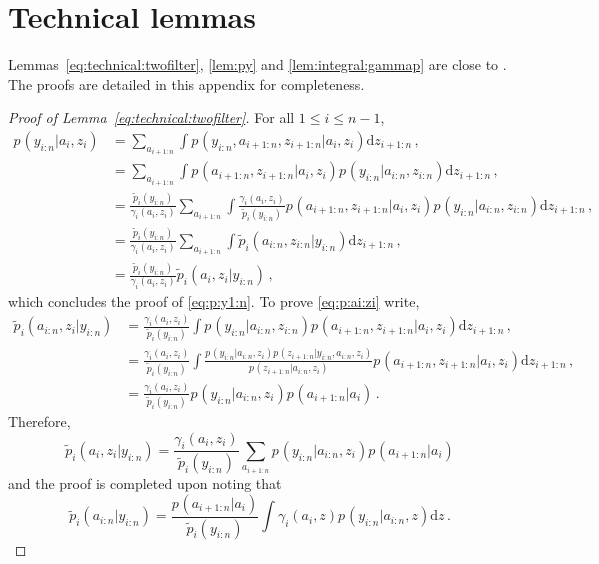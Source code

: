 \documentclass[nolayout]{article}
\theoremstyle{plain}
\theoremstyle{definition}
\newcommand{\1}{\mathbbm{1}}
\def\rmd{\mathrm{d}}
\def\eqsp{\,}
\begin{document}
\section{Technical lemmas}
\label{sec:app}
Lemmas~\ref{eq:technical:twofilter}, \ref{lem:py} and \ref{lem:integral:gammap} are close to \cite[Proposition 5, Proposition 6]{briers:doucet:maskell:2010}. The proofs are detailed in this appendix for completeness.
\begin{proof}[Proof of Lemma~\ref{eq:technical:twofilter}]
For all $1\le i \le n-1$,
\begin{align*}
p_{}(y_{i:n}|a_i,z_i) &= \sum_{a_{i+1:n}}\int p_{}(y_{i:n},a_{i+1:n},z_{i+1:n}|a_i,z_i)\rmd z_{i+1:n}\eqsp,\\
&=  \sum_{a_{i+1:n}}\int p_{}(a_{i+1:n},z_{i+1:n}|a_i,z_i)p_{}(y_{i:n}|a_{i:n},z_{i:n})\rmd z_{i+1:n}\eqsp,\\
&=  \frac{\tilde{p}_{i}(y_{i:n})}{\gamma^{}_{i}(a_i,z_i)}\sum_{a_{i+1:n}}\int \frac{\gamma^{}_{i}(a_i,z_i)}{\tilde{p}_{i}(y_{i:n})}p_{}(a_{i+1:n},z_{i+1:n}|a_i,z_i)p_{}(y_{i:n}|a_{i:n},z_{i:n})\rmd z_{i+1:n}\eqsp,\\
&=  \frac{\tilde{p}_{i}(y_{i:n})}{\gamma^{}_{i}(a_i,z_i)}\sum_{a_{i+1:n}}\int \tilde{p}_{i}(a_{i:n},z_{i:n}|y_{i:n})\rmd z_{i+1:n}\eqsp,\\
&=  \frac{\tilde{p}_{i}(y_{i:n})}{\gamma^{}_{i}(a_i,z_i)}\tilde{p}_{i}(a_{i},z_{i}|y_{i:n})\eqsp,
\end{align*}
which concludes the proof of \eqref{eq:p:y1:n}. To prove \eqref{eq:p:ai:zi} write,
\begin{align*}
\tilde{p}_{i}(a_{i:n},z_{i}|y_{i:n}) &= \frac{\gamma^{}_{i}(a_i,z_i)}{\tilde{p}_{i}(y_{i:n})}\int p_{}(y_{i:n}|a_{i:n},z_{i:n})p_{}(a_{i+1:n},z_{i+1:n}|a_{i},z_{i})\rmd z_{i+1:n}\eqsp,\\
&= \frac{\gamma^{}_{i}(a_i,z_i)}{\tilde{p}_{i}(y_{i:n})}\int \frac{p_{}(y_{i:n}|a_{i:n},z_{i})p_{}(z_{i+1:n}|y_{i:n},a_{i:n},z_i)}{p_{}(z_{i+1:n}|a_{i:n},z_i)}p_{}(a_{i+1:n},z_{i+1:n}|a_{i},z_{i})\rmd z_{i+1:n}\eqsp,\\
&=\frac{\gamma^{}_{i}(a_i,z_i)}{\tilde{p}_{i}(y_{i:n})}p_{}(y_{i:n}|a_{i:n},z_{i})p_{}(a_{i+1:n}|a_i)\eqsp.
\end{align*}
Therefore,
\[
\tilde{p}_{i}(a_{i},z_{i}|y_{i:n}) = \frac{\gamma^{}_{i}(a_i,z_i)}{\tilde{p}_{i}(y_{i:n})}\sum_{a_{i+1:n}}p_{}(y_{i:n}|a_{i:n},z_{i})p_{}(a_{i+1:n}|a_i)
\]
and the proof is completed upon noting that
\[
\tilde{p}_{i}(a_{i:n}|y_{i:n}) = \frac{p_{}(a_{i+1:n}|a_i)}{\tilde{p}_{i}(y_{i:n})} \int \gamma^{}_{i}(a_i,z)p_{}(y_{i:n}|a_{i:n},z)\rmd z\eqsp.
\]
\end{proof}
\end{document}

